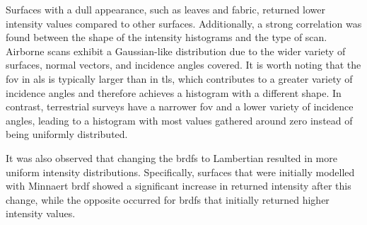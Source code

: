 
Surfaces with a dull appearance, such as leaves and fabric, returned lower intensity values compared to other surfaces. Additionally, a strong correlation was found between the shape of the intensity histograms and the type of scan. Airborne scans exhibit a Gaussian-like distribution due to the wider variety of surfaces, normal vectors, and incidence angles covered. It is worth noting that the \acrshort{fov} in \acrshort{als} is typically larger than in \acrshort{tls}, which contributes to a greater variety of incidence angles and therefore achieves a histogram with a different shape. In contrast, terrestrial surveys have a narrower \acrshort{fov} and a lower variety of incidence angles, leading to a histogram with most values gathered around zero instead of being uniformly distributed.

It was also observed that changing the \acrshort{brdf}s to Lambertian resulted in more uniform intensity distributions. Specifically, surfaces that were initially modelled with Minnaert \acrshort{brdf} showed a significant increase in returned intensity after this change, while the opposite occurred for \acrshort{brdf}s that initially returned higher intensity values.

